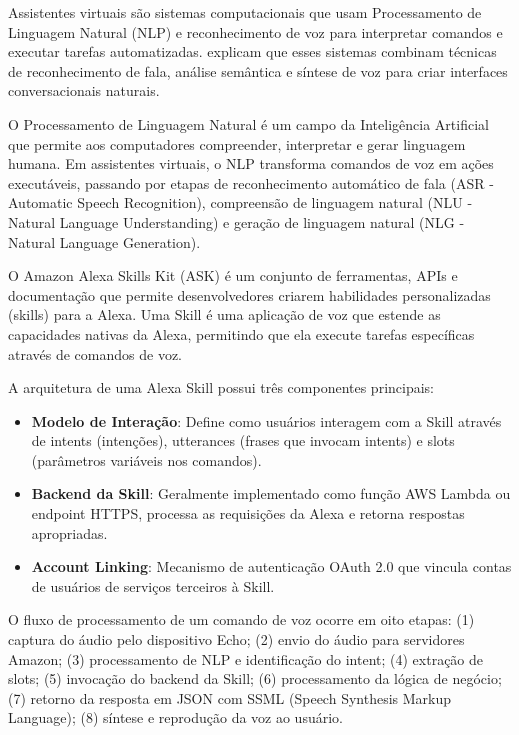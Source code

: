 \label{cap:revisao-literatura}



Assistentes virtuais são sistemas computacionais que usam Processamento de Linguagem Natural (NLP) e reconhecimento de voz para interpretar comandos e executar tarefas automatizadas. \textcite{rajanala2025} explicam que esses sistemas combinam técnicas de reconhecimento de fala, análise semântica e síntese de voz para criar interfaces conversacionais naturais.

O Processamento de Linguagem Natural é um campo da Inteligência Artificial que permite aos computadores compreender, interpretar e gerar linguagem humana. Em assistentes virtuais, o NLP transforma comandos de voz em ações executáveis, passando por etapas de reconhecimento automático de fala (ASR - Automatic Speech Recognition), compreensão de linguagem natural (NLU - Natural Language Understanding) e geração de linguagem natural (NLG - Natural Language Generation).


O Amazon Alexa Skills Kit (ASK) é um conjunto de ferramentas, APIs e documentação que permite desenvolvedores criarem habilidades personalizadas (skills) para a Alexa. Uma Skill é uma aplicação de voz que estende as capacidades nativas da Alexa, permitindo que ela execute tarefas específicas através de comandos de voz.

A arquitetura de uma Alexa Skill possui três componentes principais:

\begin{itemize}
    \item \textbf{Modelo de Interação}: Define como usuários interagem com a Skill através de intents (intenções), utterances (frases que invocam intents) e slots (parâmetros variáveis nos comandos).
    \item \textbf{Backend da Skill}: Geralmente implementado como função AWS Lambda ou endpoint HTTPS, processa as requisições da Alexa e retorna respostas apropriadas.
    \item \textbf{Account Linking}: Mecanismo de autenticação OAuth 2.0 que vincula contas de usuários de serviços terceiros à Skill.
\end{itemize}

O fluxo de processamento de um comando de voz ocorre em oito etapas: (1) captura do áudio pelo dispositivo Echo; (2) envio do áudio para servidores Amazon; (3) processamento de NLP e identificação do intent; (4) extração de slots; (5) invocação do backend da Skill; (6) processamento da lógica de negócio; (7) retorno da resposta em JSON com SSML (Speech Synthesis Markup Language); (8) síntese e reprodução da voz ao usuário.


